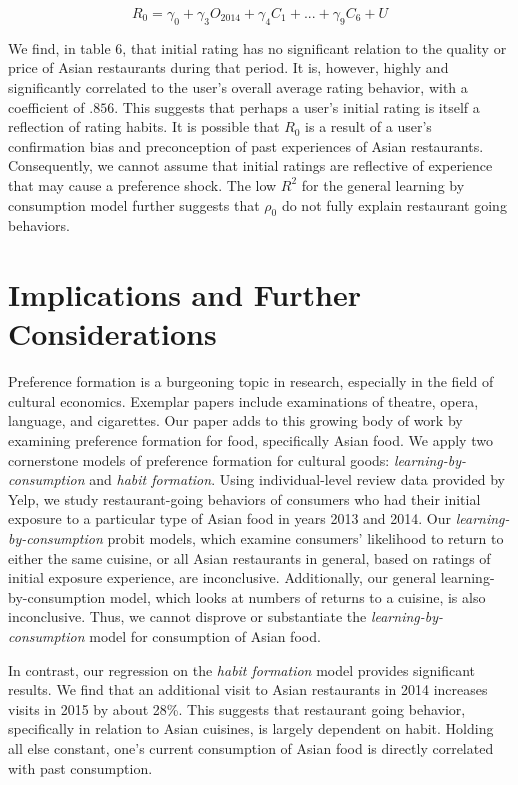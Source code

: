 \documentclass[Journal,letterpaper, NoLineNumbers]{ascelike-new}
\begin{document}
\begin{equation}
 R_{0} = \gamma_0 + \gamma_3O_{2014} + \gamma_4C_1 + ... + \gamma_9C_6 + U
\end{equation}

We find, in table 6, that initial rating has no significant relation to the quality or price of Asian restaurants during that period. It is, however, highly and significantly correlated to the user's overall average rating behavior, with a coefficient of $.856$. This suggests that perhaps a user's initial rating is itself a reflection of rating habits. It is possible that $R_0$ is a result of a user's confirmation bias and preconception of past experiences of Asian restaurants. Consequently, we cannot assume that initial ratings are reflective of experience that may cause a preference shock. The low $R^2$ for the general learning by consumption model further suggests that $\rho_0$ do not fully explain restaurant going behaviors. 

\section{Implications and Further Considerations}

Preference formation is a burgeoning topic in research, especially in the field of cultural economics. Exemplar papers include examinations of theatre, opera, language, and cigarettes. Our paper adds to this growing body of work by examining preference formation for food, specifically Asian food. We apply two cornerstone models of preference formation for cultural goods: \textit{learning-by-consumption} and \textit{habit formation}. Using individual-level review data provided by Yelp, we study restaurant-going behaviors of consumers who had their initial exposure to a particular type of Asian food in years 2013 and 2014. Our \textit{learning-by-consumption} probit models, which examine consumers' likelihood to return to either the same cuisine, or all Asian restaurants in general, based on ratings of initial exposure experience, are inconclusive. Additionally, our general learning-by-consumption model, which looks at numbers of returns to a cuisine, is also inconclusive. Thus, we cannot disprove or substantiate the \textit{learning-by-consumption} model for consumption of Asian food.

In contrast, our regression on the \textit{habit formation} model provides significant results. We find that an additional visit to Asian restaurants in 2014 increases visits in 2015 by about 28\%. This suggests that restaurant going behavior, specifically in relation to Asian cuisines, is largely dependent on habit. Holding all else constant, one's current consumption of Asian food is directly correlated with past consumption. 
\end{document}
